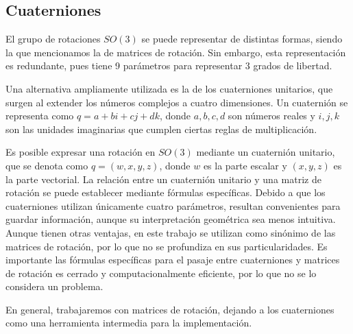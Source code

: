 \subsection{Cuaterniones}

El grupo de rotaciones $SO(3)$ se puede representar de distintas formas, siendo la que mencionamos la de matrices de rotación. Sin embargo, esta representación es redundante, pues tiene 9 parámetros para representar 3 grados de libertad. 

Una alternativa ampliamente utilizada es la de los cuaterniones unitarios, que surgen al extender los números complejos a cuatro dimensiones. Un cuaternión se representa como $q = a + bi + cj + dk$, donde $a, b, c, d$ son números reales y $i, j, k$ son las unidades imaginarias que cumplen ciertas reglas de multiplicación.

Es posible expresar una rotación en $SO(3)$ mediante un cuaternión unitario, que se denota como $q = (w, x, y, z)$, donde $w$ es la parte escalar y $(x, y, z)$ es la parte vectorial. La relación entre un cuaternión unitario y una matriz de rotación se puede establecer mediante fórmulas específicas. Debido a que los cuaterniones utilizan únicamente cuatro parámetros, resultan convenientes para guardar información, aunque su interpretación geométrica sea menos intuitiva. Aunque tienen otras ventajas, en este trabajo se utilizan como sinónimo de las matrices de rotación, por lo que no se profundiza en sus particularidades. Es importante las fórmulas específicas para el pasaje entre cuaterniones y matrices de rotación es cerrado y computacionalmente eficiente, por lo que no se lo considera un problema.

En general, trabajaremos con matrices de rotación, dejando a los cuaterniones como una herramienta intermedia para la implementación.





